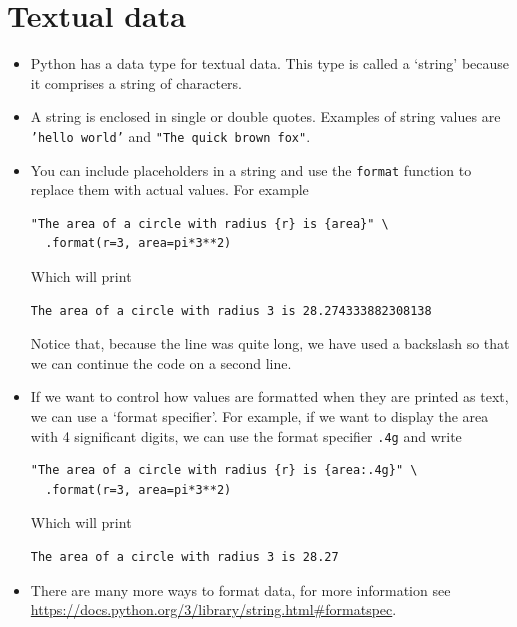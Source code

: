 \documentclass[a4paper,twoside]{memoir}
\newcommand{\shellcmd}{\texttt}
\begin{document}
\section{Textual data}
\label{sec:textual}
\begin{itemize}
\item Python has a data type for textual data.  This type is called a `string' because it comprises a string of characters.
\item A string is enclosed in single or double quotes.  Examples of string values are \shellcmd{'hello world'} and \shellcmd{"The quick brown fox"}.
\item You can include placeholders in a string and use the \shellcmd{format} function to replace them with actual values.  For example
\begin{verbatim}
"The area of a circle with radius {r} is {area}" \
  .format(r=3, area=pi*3**2)
\end{verbatim}

Which will print
\begin{verbatim}
The area of a circle with radius 3 is 28.274333882308138
\end{verbatim}
Notice that, because the line was quite long, we have used a backslash so that we can continue the code on a second line.

\item If we want to control how values are formatted when they are printed as text, we can use a `format specifier'.  For example, if we want to display the area with 4 significant digits, we can use the format specifier \shellcmd{.4g} and write
\begin{verbatim}
"The area of a circle with radius {r} is {area:.4g}" \
  .format(r=3, area=pi*3**2)
\end{verbatim}

Which will print
\begin{verbatim}The area of a circle with radius 3 is 28.27\end{verbatim}

\item There are many more ways to format data, for more information see \url{https://docs.python.org/3/library/string.html#formatspec}.


\end{itemize}
\end{document}
